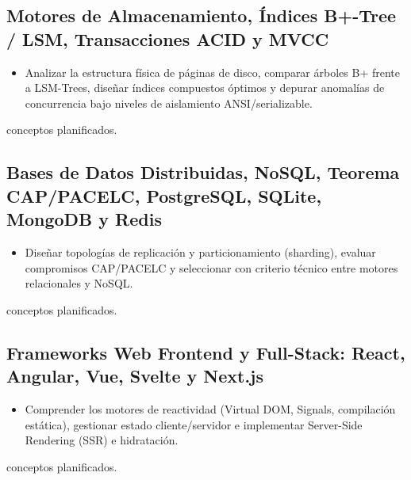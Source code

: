 \documentclass{book}
\begin{document}
\subsection*{\checkmark Motores de Almacenamiento, Índices B+-Tree / LSM, Transacciones ACID y MVCC}
\begin{itemize}
\item Analizar la estructura física de páginas de disco, comparar árboles B+ frente a LSM-Trees, diseñar índices compuestos óptimos y depurar anomalías de concurrencia bajo niveles de aislamiento ANSI/serializable.
\end{itemize}
 conceptos planificados.

\subsection*{\checkmark Bases de Datos Distribuidas, NoSQL, Teorema CAP/PACELC, PostgreSQL, SQLite, MongoDB y Redis}
\begin{itemize}
\item Diseñar topologías de replicación y particionamiento (sharding), evaluar compromisos CAP/PACELC y seleccionar con criterio técnico entre motores relacionales y NoSQL.
\end{itemize}
 conceptos planificados.

\subsection*{\checkmark Frameworks Web Frontend y Full-Stack: React, Angular, Vue, Svelte y Next.js}
\begin{itemize}
\item Comprender los motores de reactividad (Virtual DOM, Signals, compilación estática), gestionar estado cliente/servidor e implementar Server-Side Rendering (SSR) e hidratación.
\end{itemize}
 conceptos planificados.
\end{document}
